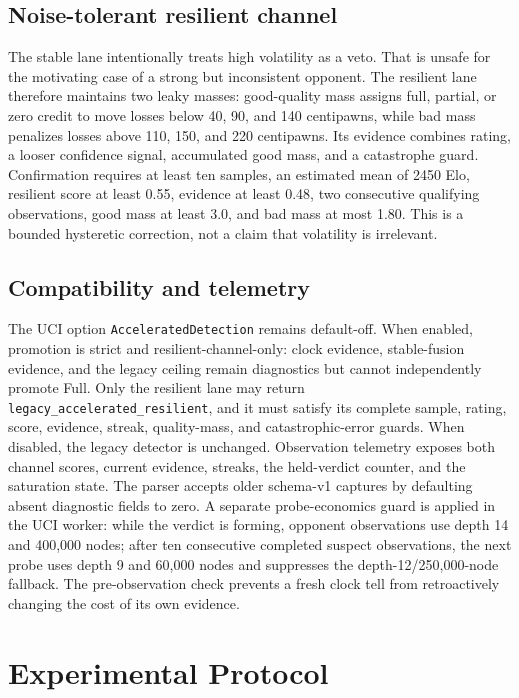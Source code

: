 \documentclass[conference]{IEEEtran}
\begin{document}
\subsection{Noise-tolerant resilient channel}
The stable lane intentionally treats high volatility as a veto. That is unsafe for the motivating case of a strong but inconsistent opponent. The resilient lane therefore maintains two leaky masses: good-quality mass assigns full, partial, or zero credit to move losses below 40, 90, and 140 centipawns, while bad mass penalizes losses above 110, 150, and 220 centipawns. Its evidence combines rating, a looser confidence signal, accumulated good mass, and a catastrophe guard. Confirmation requires at least ten samples, an estimated mean of 2450 Elo, resilient score at least 0.55, evidence at least 0.48, two consecutive qualifying observations, good mass at least 3.0, and bad mass at most 1.80. This is a bounded hysteretic correction, not a claim that volatility is irrelevant.

\subsection{Compatibility and telemetry}
The UCI option \texttt{AcceleratedDetection} remains default-off. When enabled, promotion is strict and resilient-channel-only: clock evidence, stable-fusion evidence, and the legacy ceiling remain diagnostics but cannot independently promote Full. Only the resilient lane may return \texttt{legacy\_accelerated\_resilient}, and it must satisfy its complete sample, rating, score, evidence, streak, quality-mass, and catastrophic-error guards. When disabled, the legacy detector is unchanged. Observation telemetry exposes both channel scores, current evidence, streaks, the held-verdict counter, and the saturation state. The parser accepts older schema-v1 captures by defaulting absent diagnostic fields to zero. A separate probe-economics guard is applied in the UCI worker: while the verdict is forming, opponent observations use depth 14 and 400,000 nodes; after ten consecutive completed suspect observations, the next probe uses depth 9 and 60,000 nodes and suppresses the depth-12/250,000-node fallback. The pre-observation check prevents a fresh clock tell from retroactively changing the cost of its own evidence.

\section{Experimental Protocol}
\end{document}
